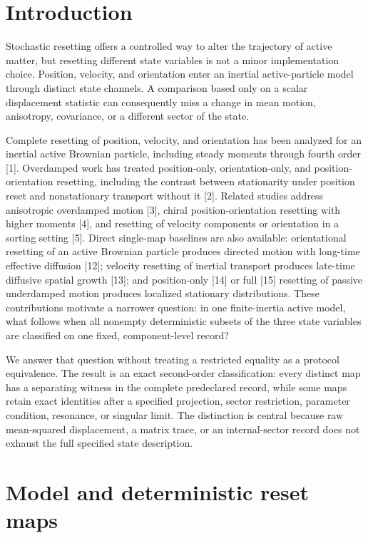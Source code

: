 \section{Introduction}\label{introduction}

Stochastic resetting offers a controlled way to alter the trajectory of active matter, but resetting different state variables is not a minor implementation choice. Position, velocity, and orientation enter an inertial active-particle model through distinct state channels. A comparison based only on a scalar displacement statistic can consequently miss a change in mean motion, anisotropy, covariance, or a different sector of the state.

Complete resetting of position, velocity, and orientation has been analyzed for an inertial active Brownian particle, including steady moments through fourth order {[}1{]}. Overdamped work has treated position-only, orientation-only, and position-orientation resetting, including the contrast between stationarity under position reset and nonstationary transport without it {[}2{]}. Related studies address anisotropic overdamped motion {[}3{]}, chiral position-orientation resetting with higher moments {[}4{]}, and resetting of velocity components or orientation in a sorting setting {[}5{]}. Direct single-map baselines are also available: orientational resetting of an active Brownian particle produces directed motion with long-time effective diffusion {[}12{]}; velocity resetting of inertial transport produces late-time diffusive spatial growth {[}13{]}; and position-only {[}14{]} or full {[}15{]} resetting of passive underdamped motion produces localized stationary distributions. These contributions motivate a narrower question: in one finite-inertia active model, what follows when all nonempty deterministic subsets of the three state variables are classified on one fixed, component-level record?

We answer that question without treating a restricted equality as a protocol equivalence. The result is an exact second-order classification: every distinct map has a separating witness in the complete predeclared record, while some maps retain exact identities after a specified projection, sector restriction, parameter condition, resonance, or singular limit. The distinction is central because raw mean-squared displacement, a matrix trace, or an internal-sector record does not exhaust the full specified state description.

\section{Model and deterministic reset maps}\label{model-and-deterministic-reset-maps}


